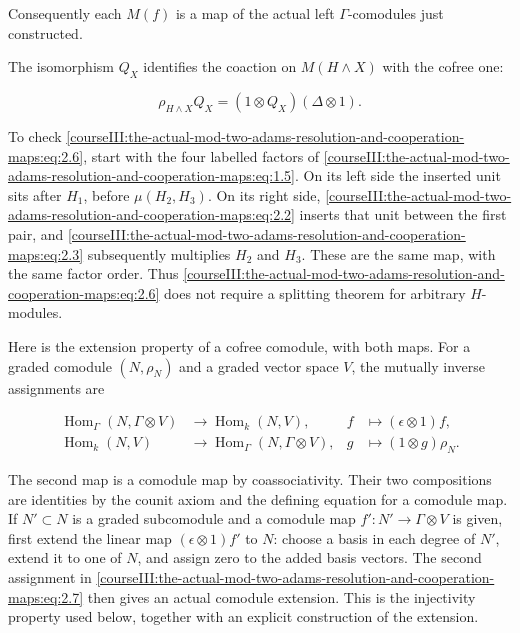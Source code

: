 Consequently each \(M(f)\) is a map of the actual left \(\Gamma\)-comodules just constructed.

The isomorphism \(Q_X\) identifies the coaction on \(M(H\wedge X)\) with the cofree one:

\begin{equation}
\rho_{H\wedge X}Q_X
   =(1\otimes Q_X)(\Delta\otimes1).
 \label{courseIII:the-actual-mod-two-adams-resolution-and-cooperation-maps:eq:2.6}
\end{equation}

To check \eqref{courseIII:the-actual-mod-two-adams-resolution-and-cooperation-maps:eq:2.6}, start with the four labelled factors of \eqref{courseIII:the-actual-mod-two-adams-resolution-and-cooperation-maps:eq:1.5}. On its left side the inserted unit sits after \(H_1\), before \(\mu(H_2,H_3)\). On its right side, \eqref{courseIII:the-actual-mod-two-adams-resolution-and-cooperation-maps:eq:2.2} inserts that unit between the first pair, and \eqref{courseIII:the-actual-mod-two-adams-resolution-and-cooperation-maps:eq:2.3} subsequently multiplies \(H_2\) and \(H_3\). These are the same map, with the same factor order. Thus \eqref{courseIII:the-actual-mod-two-adams-resolution-and-cooperation-maps:eq:2.6} does not require a splitting theorem for arbitrary \(H\)-modules.

Here is the extension property of a cofree comodule, with both maps. For a graded comodule \((N,\rho_N)\) and a graded vector space \(V\), the mutually inverse assignments are

\begin{equation}
\begin{aligned}
 \operatorname{Hom}_{\Gamma}(N,\Gamma\otimes V)
   &\longrightarrow\operatorname{Hom}_k(N,V),
       &f&\longmapsto(\epsilon\otimes1)f,\\
 \operatorname{Hom}_k(N,V)
   &\longrightarrow\operatorname{Hom}_{\Gamma}(N,\Gamma\otimes V),
       &g&\longmapsto(1\otimes g)\rho_N.
 \end{aligned}
 \label{courseIII:the-actual-mod-two-adams-resolution-and-cooperation-maps:eq:2.7}
\end{equation}

The second map is a comodule map by coassociativity. Their two compositions are identities by the counit axiom and the defining equation for a comodule map. If \(N'\subset N\) is a graded subcomodule and a comodule map \(f':N'\to\Gamma\otimes V\) is given, first extend the linear map \((\epsilon\otimes1)f'\) to \(N\): choose a basis in each degree of \(N'\), extend it to one of \(N\), and assign zero to the added basis vectors. The second assignment in \eqref{courseIII:the-actual-mod-two-adams-resolution-and-cooperation-maps:eq:2.7} then gives an actual comodule extension. This is the injectivity property used below, together with an explicit construction of the extension.

